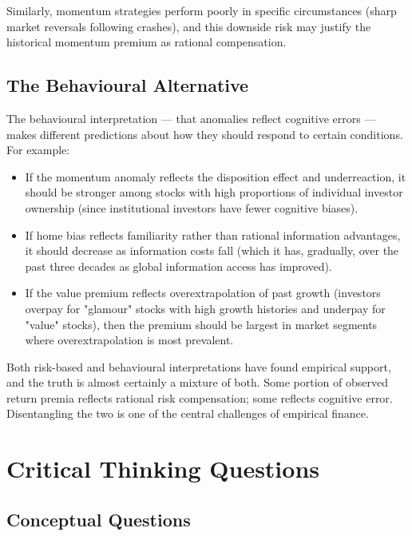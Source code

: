 \documentclass[12pt, letterpaper]{article}
\begin{document}
Similarly, momentum strategies perform poorly in specific circumstances (sharp market reversals following crashes), and this downside risk may justify the historical momentum premium as rational compensation.


\subsection{The Behavioural Alternative}


The behavioural interpretation --- that anomalies reflect cognitive errors --- makes different predictions about how they should respond to certain conditions. For example:

\begin{itemize}
\item If the momentum anomaly reflects the disposition effect and underreaction, it should be stronger among stocks with high proportions of individual investor ownership (since institutional investors have fewer cognitive biases).
\item If home bias reflects familiarity rather than rational information advantages, it should decrease as information costs fall (which it has, gradually, over the past three decades as global information access has improved).
\item If the value premium reflects overextrapolation of past growth (investors overpay for "glamour" stocks with high growth histories and underpay for "value" stocks), then the premium should be largest in market segments where overextrapolation is most prevalent.
\end{itemize}

Both risk-based and behavioural interpretations have found empirical support, and the truth is almost certainly a mixture of both. Some portion of observed return premia reflects rational risk compensation; some reflects cognitive error. Disentangling the two is one of the central challenges of empirical finance.

\medskip


\section*{Critical Thinking Questions}



\subsection{Conceptual Questions}
\end{document}

